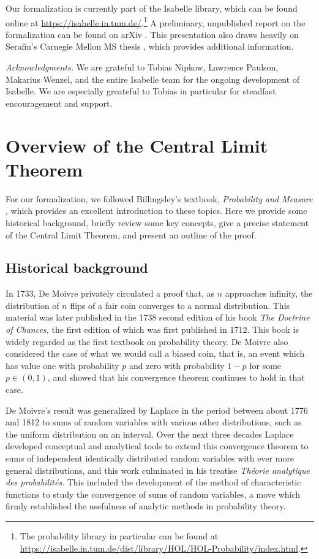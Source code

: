 \documentclass{svjour3}
\begin{document}
Our formalization is currently part of the Isabelle library, which can be found online at \url{https://isabelle.in.tum.de/}.\footnote{The probability library in particular can be found at \url{https://isabelle.in.tum.de/dist/library/HOL/HOL-Probability/index.html}.} A preliminary, unpublished report on the formalization can be found on arXiv \cite{avigad:hoelzl:serafin:14}. This presentation also draws heavily on Serafin's Carnegie Mellon MS thesis \cite{serafin:15}, which provides additional information.

\emph{Acknowledgments.} We are grateful to Tobias Nipkow, Lawrence Paulson, Makarius Wenzel, and the entire Isabelle team for the ongoing development of Isabelle. We are especially greateful to Tobias in particular for steadfast encouragement and support.

\section{Overview of the Central Limit Theorem}
\label{section:overview}

For our formalization, we followed Billingsley's textbook, \emph{Probability and Measure} \cite{billingsley:95}, which provides an excellent introduction to these topics. Here we provide some historical background, briefly review some key concepts, give a precise statement of the Central Limit Theorem, and present an outline of the proof.

\subsection{Historical background}
\label{subsection:historical}

In 1733, De Moivre privately circulated a proof that, as $n$ approaches infinity, the distribution of $n$ flips of a fair coin converges to a normal distribution. This material was later published in the 1738 second edition of his book {\em The Doctrine of Chances,} the first edition of which was first published in 1712. This book is widely regarded as the first textbook on probability theory. De Moivre also considered the case of what we would call a biased coin, that is, an event which has value one with probability $p$ and zero with probability $1-p$ for some $p \in (0,1)$, and showed that his convergence theorem continues to hold in that case.

De Moivre's result was generalized by Laplace in the period between about 1776 and 1812 to sums of random variables with various other distributions, such as the uniform distribution on an interval. Over the next three decades Laplace developed conceptual and analytical tools to extend this convergence theorem to sums of independent identically distributed random variables with ever more general distributions, and this work culminated in his treatise {\em Th\'eorie analytique des probabilit\'es}. This included the development of the method of characteristic functions to study the convergence of sums of random variables, a move which firmly established the usefulness of analytic methods in probability theory.
\end{document}
